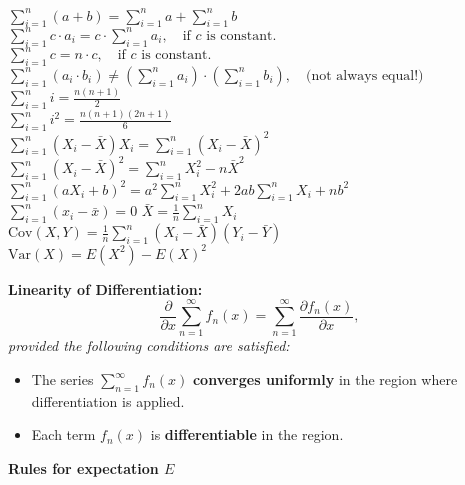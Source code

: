 \documentclass[a4paper,11pt]{article}
\renewcommand{\textbf}[1]{{\scriptsize	\bfseries #1}}
\begin{document}
\begin{footnotesize}
\begin{multicols}{2}
\begin{minipage}{\linewidth}
\(\sum_{i=1}^n (a + b) = \sum_{i=1}^n a + \sum_{i=1}^n b\) \\
\(\sum_{i=1}^n c \cdot a_i = c \cdot \sum_{i=1}^n a_i, \quad \text{if } c \text{ is constant.}\) \\
\(\sum_{i=1}^n c = n \cdot c, \quad \text{if } c \text{ is constant.}\) \\
\(\sum_{i=1}^n (a_i \cdot b_i) \neq \left( \sum_{i=1}^n a_i \right) \cdot \left( \sum_{i=1}^n b_i \right), \quad \text{(not always equal!)}\) \\
\(\sum_{i=1}^n i = \frac{n(n+1)}{2}\) \\
\(\sum_{i=1}^n i^2 = \frac{n(n+1)(2n+1)}{6}\) \\
\(\sum_{i=1}^n (X_i - \bar{X}) X_i = \sum_{i=1}^n (X_i - \bar{X})^2\) \\
\(\sum_{i=1}^n (X_i - \bar{X})^2 = \sum_{i=1}^n X_i^2 - n\bar{X}^2\) \\
\(\sum_{i=1}^n (a X_i + b)^2 = a^2 \sum_{i=1}^n X_i^2 + 2ab \sum_{i=1}^n X_i + nb^2\) \\
\(\sum_{i=1}^n (x_i - \bar{x}) = 0\)
\(\bar{X} = \frac{1}{n} \sum_{i=1}^n X_i\)
\(\text{Cov}(X, Y) = \frac{1}{n} \sum_{i=1}^n (X_i - \bar{X})(Y_i - \bar{Y})\) \\
\(\text{Var}(X) = E(X^2) - E(X)^2\) \\
\end{minipage}
\begin{minipage}{\linewidth}
\textbf{Linearity of Differentiation:}  
\[
\frac{\partial}{\partial x} \sum_{n=1}^\infty f_n(x) = \sum_{n=1}^\infty \frac{\partial f_n(x)}{\partial x},
\]
\textit{provided the following conditions are satisfied:}
\begin{itemize}
    \item The series \(\sum_{n=1}^\infty f_n(x)\) \textbf{converges uniformly} in the region where differentiation is applied.
    \item Each term \(f_n(x)\) is \textbf{differentiable} in the region.
\end{itemize}


\end{minipage}
\begin{minipage}{\linewidth}

\textbf{Rules for expectation \(E\)} 


\end{minipage}
\end{multicols}
\end{footnotesize}
\end{document}
